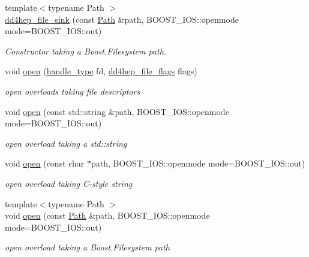 \begin{DoxyCompactItemize}
{\footnotesize template$<$typename Path $>$ }\\\hyperlink{class_d_d4hep_1_1dd4hep__file__sink_a29264d126bcd8d00a3cb2c8d597c4c16}{dd4hep\+\_\+file\+\_\+sink} (const \hyperlink{class_d_d4hep_1_1_path}{Path} \&path, B\+O\+O\+S\+T\+\_\+\+I\+O\+S\+::openmode mode=B\+O\+O\+S\+T\+\_\+\+I\+O\+S\+::out)
\begin{DoxyCompactList}\small\item\em Constructor taking a Boost.\+Filesystem path. \end{DoxyCompactList}\item 
void \hyperlink{class_d_d4hep_1_1dd4hep__file__sink_a55c1fa794f9474e51d6489496843e358}{open} (\hyperlink{class_d_d4hep_1_1dd4hep__file_a4d79f8d433cd7831ff818691424cd6fc}{handle\+\_\+type} fd, \hyperlink{namespace_d_d4hep_a31d19f9b0ce567067d2897fbda1761e5}{dd4hep\+\_\+file\+\_\+flags} flags)
\begin{DoxyCompactList}\small\item\em open overloads taking file descriptors \end{DoxyCompactList}\item 
void \hyperlink{class_d_d4hep_1_1dd4hep__file__sink_a5b7bcc7d6d67664ffa22bd8115903a7a}{open} (const std\+::string \&path, B\+O\+O\+S\+T\+\_\+\+I\+O\+S\+::openmode mode=B\+O\+O\+S\+T\+\_\+\+I\+O\+S\+::out)
\begin{DoxyCompactList}\small\item\em open overload taking a std\+::string \end{DoxyCompactList}\item 
void \hyperlink{class_d_d4hep_1_1dd4hep__file__sink_aae7af8ee1e98ae89b380ddf2dc3f51f9}{open} (const char $\ast$path, B\+O\+O\+S\+T\+\_\+\+I\+O\+S\+::openmode mode=B\+O\+O\+S\+T\+\_\+\+I\+O\+S\+::out)
\begin{DoxyCompactList}\small\item\em open overload taking C-\/style string \end{DoxyCompactList}\item 
{\footnotesize template$<$typename Path $>$ }\\void \hyperlink{class_d_d4hep_1_1dd4hep__file__sink_a3909d844e3561c8527f7c2c47a6910b4}{open} (const \hyperlink{class_d_d4hep_1_1_path}{Path} \&path, B\+O\+O\+S\+T\+\_\+\+I\+O\+S\+::openmode mode=B\+O\+O\+S\+T\+\_\+\+I\+O\+S\+::out)
\begin{DoxyCompactList}\small\item\em open overload taking a Boost.\+Filesystem path \end{DoxyCompactList}\end{DoxyCompactItemize}
